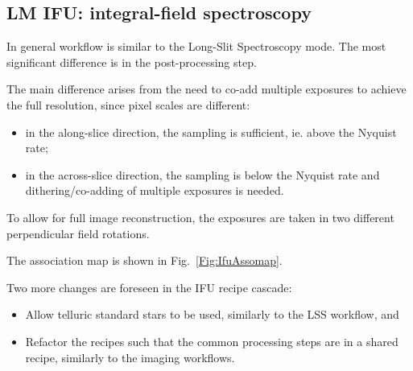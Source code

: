 \subsection{LM IFU: integral-field spectroscopy}
\label{ssec:overview_ifu}

In general workflow is similar to the Long-Slit Spectroscopy mode.
The most significant difference is in the post-processing step.

The main difference arises from the need to co-add multiple exposures
to achieve the full resolution, since pixel scales are different:
\begin{itemize}
    \item in the along-slice direction, the sampling is sufficient, ie. above the Nyquist rate;
    \item in the across-slice direction, the sampling is below the Nyquist rate
        and dithering/co-adding of multiple exposures is needed.
\end{itemize}

To allow for full image reconstruction, the exposures are taken in two different
perpendicular field rotations.

The association map is shown in Fig.~\ref{Fig:IfuAssomap}.


Two more changes are foreseen in the IFU recipe cascade:
\begin{itemize}
    \item Allow telluric standard stars to be used, similarly to the LSS workflow, and

    \item Refactor the recipes such that the common processing steps are in a shared recipe, similarly to the imaging workflows.
\end{itemize}


